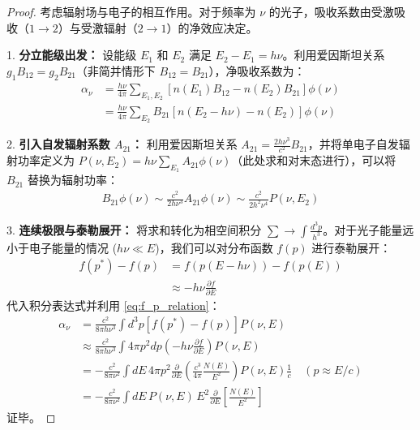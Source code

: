 \begin{proof}
    考虑辐射场与电子的相互作用。对于频率为 $\nu$ 的光子，吸收系数由受激吸收（$1 \to 2$）与受激辐射（$2 \to 1$）的净效应决定。
    
    1. \textbf{分立能级出发：}
    设能级 $E_1$ 和 $E_2$ 满足 $E_2 - E_1 = h\nu$。利用爱因斯坦关系 $g_1 B_{12} = g_2 B_{21}$（非简并情形下 $B_{12}=B_{21}$），净吸收系数为：
    \begin{align}
        \alpha_{\nu} &= \frac{h\nu}{4\pi} \sum_{E_1, E_2} \left[ n(E_1) B_{12} - n(E_2) B_{21} \right] \phi(\nu) \\
        &= \frac{h\nu}{4\pi} \sum_{E_2} B_{21} \left[ n(E_2 - h\nu) - n(E_2) \right] \phi(\nu) \label{eq:discrete_alpha}
    \end{align}
    
    2. \textbf{引入自发辐射系数 $A_{21}$：}
    利用爱因斯坦关系 $A_{21} = \frac{2h\nu^3}{c^2} B_{21}$，并将单电子自发辐射功率定义为 $P(\nu, E_2) = h\nu \sum_{E_1} A_{21} \phi(\nu)$（此处求和对末态进行），可以将 $B_{21}$ 替换为辐射功率：
    \begin{align}
        B_{21} \phi(\nu) \sim \frac{c^2}{2h\nu^3} A_{21} \phi(\nu) \sim \frac{c^2}{2h^2\nu^4} P(\nu, E_2)
    \end{align}

    3. \textbf{连续极限与泰勒展开：}
    将求和转化为相空间积分 $\sum \to \int \frac{d^3p}{h^3}$。对于光子能量远小于电子能量的情况 ($h\nu \ll E$)，我们可以对分布函数 $f(p)$ 进行泰勒展开：
    \begin{align}
        f(p^*) - f(p) &= f(p(E-h\nu)) - f(p(E)) \\
        &\approx - h\nu \frac{\partial f}{\partial E}
    \end{align}
    代入积分表达式并利用 \eqref{eq:f_p_relation}：
    \begin{align}
        \alpha_{\nu} &= \frac{c^2}{8\pi h \nu^3} \int d^3p \left[ f(p^*) - f(p) \right] P(\nu, E) \\
        &\approx \frac{c^2}{8\pi h \nu^3} \int 4\pi p^2 dp \left( -h\nu \frac{\partial f}{\partial E} \right) P(\nu, E) \\
        &= - \frac{c^2}{8\pi \nu^2} \int dE \, 4\pi p^2 \frac{\partial}{\partial E} \left( \frac{c^3}{4\pi} \frac{N(E)}{E^2} \right) P(\nu, E) \frac{1}{c} \quad (p \approx E/c) \\
        &= - \frac{c^2}{8\pi \nu^2} \int dE \, P(\nu, E) \, E^2 \frac{\partial}{\partial E} \left[ \frac{N(E)}{E^2} \right]
    \end{align}
    证毕。
\end{proof}

